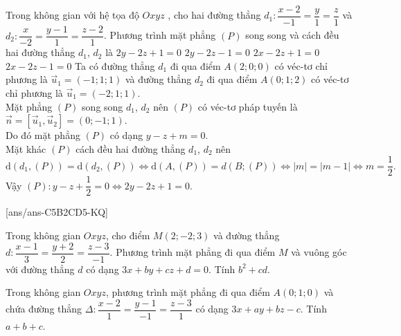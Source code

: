 \begin{ex}%
Trong không gian với hệ tọa độ $Oxyz$ , cho hai đường thẳng $d_1\colon\dfrac{x-2}{-1}=\dfrac{y}{1}=\dfrac{z}{1}$ và $d_2\colon\dfrac{x}{-2}=\dfrac{y-1}{1}=\dfrac{z-2}{1}$. Phương trình mặt phẳng $(P)$ song song và cách đều hai đường thẳng $d_1$, ${d_2}$ là
\choice
{\True $ 2y-2z+1=0$}
{$ 2y-2z-1=0$}
{$2x-2z+1=0$}
{$2x-2z-1=0$}
\loigiai
{
Ta có đường thẳng $d_1$ đi qua điểm $ A(2;0;0)$ có véc-tơ chỉ phương là $\overrightarrow{u}_1=(-1;1;1)$ và đường thẳng $d_2$ đi qua điểm $ A(0;1;2)$ có véc-tơ chỉ phương là $\overrightarrow{u}_1=(-2; 1; 1)$.\\
Mặt phẳng $(P)$ song song $d_1$, ${d_2}$ nên $(P)$ có véc-tơ pháp tuyến là $\overrightarrow{n}=\left[\overrightarrow{u}_1,\overrightarrow{u}_2\right]=(0;-1;1)$.\\
Do đó mặt phẳng $(P)$ có dạng $ y-z+m=0$.\\
Mặt khác $(P)$ cách đều hai đường thẳng $d_1$, ${d_2}$ nên\\
$$ \mathrm{d}\left(d_1,(P)\right)=\mathrm{d}\left(d_2,(P)\right)\Leftrightarrow \mathrm{d}\left(A,(P)\right)=d\left(B;(P)\right)\Leftrightarrow\left| m\right|=\left| m-1\right|\Leftrightarrow m=\dfrac{1}{2}.$$
Vậy $(P)\colon y-z+\dfrac{1}{2}=0\Leftrightarrow 2y-2z+1=0$.}
\end{ex}
\TNSA
{}[ans/ans-C5B2CD5-KQ]
\begin{ex}%
Trong không gian $Oxyz$, cho điểm $M(2; -2; 3)$ và đường thẳng \break $d\colon \dfrac{x-1}{3}=\dfrac{y+2}{2}=\dfrac{z-3}{-1}$. Phương trình mặt phẳng đi qua điểm $M$ và vuông góc với đường thẳng $d$ có dạng $3x+by+cz+d=0$. Tính $b^2+cd$.
\end{ex}

\begin{ex}%
Trong không gian $Oxyz$, phương trình mặt phẳng đi qua điểm $A(0; 1; 0)$ và chứa đường thẳng $\Delta\colon \dfrac{x-2}{1}=\dfrac{y-1}{-1}=\dfrac{z-3}{1}$ có dạng $3x+ay+bz-c$. Tính $a+b+c$.
\end{ex}

